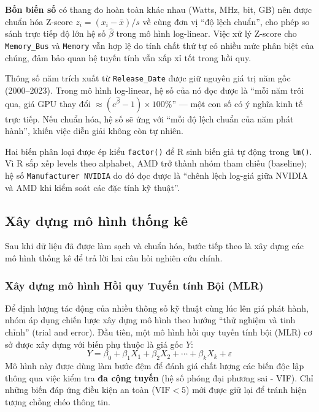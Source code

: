 \documentclass[a4paper]{article}
\begin{document}
\textbf{Bốn biến số} có thang đo hoàn toàn khác nhau (Watts, MHz, bit, GB) nên được chuẩn hóa Z-score $z_i = (x_i - \bar{x})/s$ về cùng đơn vị ``độ lệch chuẩn'', cho phép so sánh trực tiếp độ lớn hệ số $\hat{\beta}$ trong mô hình log-linear. Việc xử lý Z-score cho \texttt{Memory\_Bus} và \texttt{Memory} vẫn hợp lệ do tính chất thứ tự có nhiều mức phân biệt của chúng, đảm bảo quan hệ tuyến tính vẫn xấp xỉ tốt trong hồi quy.

Thông số năm trích xuất từ \texttt{Release\_Date} được giữ nguyên giá trị năm gốc (2000--2023). Trong mô hình log-linear, hệ số của nó đọc được là ``mỗi năm trôi qua, giá GPU thay đổi $\approx (e^{\hat{\beta}} - 1) \times 100\%$'' --- một con số có ý nghĩa kinh tế trực tiếp. Nếu chuẩn hóa, hệ số sẽ ứng với ``mỗi độ lệch chuẩn của năm phát hành'', khiến việc diễn giải không còn tự nhiên.

Hai biến phân loại được ép kiểu \texttt{factor()} để R sinh biến giả tự động trong \texttt{lm()}. Vì R sắp xếp levels theo alphabet, AMD trở thành nhóm tham chiếu (baseline); hệ số \texttt{Manufacturer NVIDIA} do đó đọc được là ``chênh lệch log-giá giữa NVIDIA và AMD khi kiểm soát các đặc tính kỹ thuật''.

\subsection{Xây dựng mô hình thống kê}

Sau khi dữ liệu đã được làm sạch và chuẩn hóa, bước tiếp theo là xây dựng các mô hình thống kê để trả lời hai câu hỏi nghiên cứu chính.

\subsubsection{Xây dựng mô hình Hồi quy Tuyến tính Bội (MLR)}

Để định lượng tác động của nhiều thông số kỹ thuật cùng lúc lên giá phát hành, nhóm áp dụng chiến lược xây dựng mô hình theo hướng ``thử nghiệm và tinh chỉnh'' (trial and error). Đầu tiên, một mô hình hồi quy tuyến tính bội (MLR) cơ sở được xây dựng với biến phụ thuộc là giá gốc $Y$:
\[
  Y = \beta_0 + \beta_1 X_1 + \beta_2 X_2 + \cdots + \beta_k X_k + \varepsilon
\]
Mô hình này được dùng làm bước đệm để đánh giá chất lượng các biến độc lập thông qua việc kiểm tra \textbf{đa cộng tuyến} (hệ số phóng đại phương sai - VIF). Chỉ những biến đáp ứng điều kiện an toàn ($\text{VIF} < 5$) mới được giữ lại để tránh hiện tượng chồng chéo thông tin.
\end{document}
